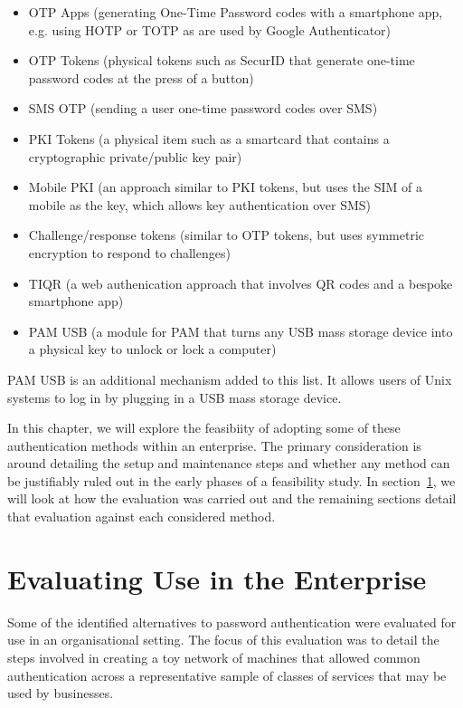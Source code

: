\documentclass{report}
\begin{document}
\begin{itemize}
  \item OTP Apps (generating One-Time Password codes with a smartphone app, e.g.
    using HOTP or TOTP as are used by Google Authenticator)
  \item OTP Tokens (physical tokens such as SecurID that generate one-time
    password codes at the press of a button)
  \item SMS OTP (sending a user one-time password codes over SMS)
  \item PKI Tokens (a physical item such as a smartcard that contains
    a cryptographic private/public key pair)
  \item Mobile PKI (an approach similar to PKI tokens, but uses the SIM of a
    mobile as the key, which allows key authentication over SMS)
  \item Challenge/response tokens (similar to OTP tokens, but uses symmetric
    encryption to respond to challenges)
  \item TIQR (a web authenication approach that involves QR codes and a
    bespoke smartphone app)
  \item PAM USB (a module for PAM that turns any USB mass storage device
    into a physical key to unlock or lock a computer)
\end{itemize}

PAM USB is an additional mechanism added to
this list. It allows users of Unix systems to log in by plugging in a USB
mass storage device.

In this chapter, we will explore the feasibiity of adopting some of
these authentication methods within an enterprise. The primary consideration
is around detailing the setup and maintenance steps and whether any
method can be justifiably ruled out in the early phases of a feasibility
study. In section~\ref{sec:evaluation}, we will look at how the evaluation
was carried out and the remaining sections detail that evaluation against each
considered method.

\section{Evaluating Use in the Enterprise}
\label{sec:evaluation}

Some of the identified alternatives to password authentication were
evaluated for use in an organisational setting. The focus of this evaluation
was to detail the steps involved in creating a toy network of machines
that allowed common authentication across a representative sample of
classes of services that may be used by businesses.
\end{document}
